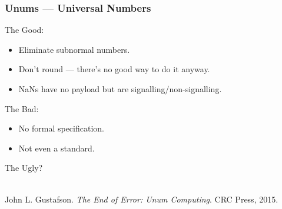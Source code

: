 \begin{frame}

\frametitle{Unums --- Universal Numbers}

The Good:

\begin{itemize}

\item Eliminate subnormal numbers.

\item Don't round --- there's no good way to do it anyway.

\item NaNs have no payload but are signalling/non-signalling.

\end{itemize}

The Bad:

\begin{itemize}

\item No formal specification.

\item Not even a standard.

\end{itemize}

The Ugly?

\vspace{\fill}

\footnotesize

\begin{thebibliography}{9}

 \\ John L. Gustafson. \emph{The End
of Error: Unum Computing}. CRC Press, 2015.

\end{thebibliography}

\end{frame}
